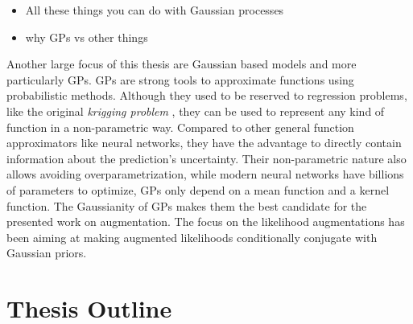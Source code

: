 \begin{itemize}
    \item All these things you can do with Gaussian processes
    \item why \ac{GPs} vs other things
\end{itemize}

Another large focus of this thesis are Gaussian based models and more particularly \acf{GPs}.
\ac{GPs} are strong tools to approximate functions using probabilistic methods.
Although they used to be reserved to regression problems, like the original \textit{krigging problem} \needcite, they can be used to represent any kind of function in a non-parametric way.
Compared to other general function approximators like neural networks, they have the advantage to directly contain information about the prediction's uncertainty.
Their non-parametric nature also allows avoiding overparametrization, while modern neural networks have billions of parameters to optimize, \ac{GPs} only depend on a mean function and a kernel function.
The Gaussianity of \ac{GPs} makes them the best candidate for the presented work on augmentation.
The focus on the likelihood augmentations has been aiming at making augmented likelihoods conditionally conjugate with Gaussian priors.


\section{Thesis Outline}

